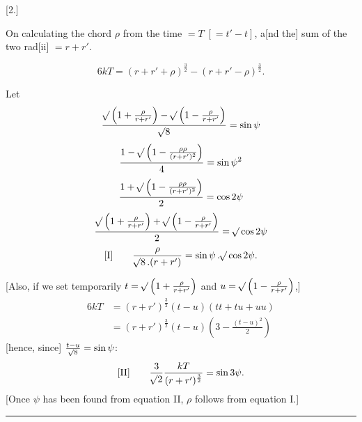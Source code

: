 \clearpage
{}
\begin{center}
[2.]\par
\medskip
On calculating the chord \(\rho\) from the time \(=T\;[=t'-t]\), a[nd the] sum of the two rad[ii] \(=r+r'\).
\end{center}
\[
6kT=(r+r'+\rho)^{\frac{3}{2}}-(r+r'-\rho)^{\frac{3}{2}}.
\]

Let
\[
\frac{\mathord{{}^{}\!\surd}\left(1+\frac{\rho}{r+r'}\right)-\mathord{{}^{}\!\surd}\left(1-\frac{\rho}{r+r'}\right)}{\mathord{{}^{}\!\surd}8}=\sin\psi
\]
\[
\frac{1-\mathord{{}^{}\!\surd}\left(1-\frac{\rho\rho}{(r+r')^2}\right)}{4}=\sin\psi^2
\]
\[
\frac{1+\mathord{{}^{}\!\surd}\left(1-\frac{\rho\rho}{(r+r')^2}\right)}{2}=\cos2\psi
\]
\[
\frac{\mathord{{}^{}\!\surd}\left(1+\frac{\rho}{r+r'}\right)+\mathord{{}^{}\!\surd}\left(1-\frac{\rho}{r+r'}\right)}{2}=\mathord{{}^{}\!\surd}\cos2\psi
\]
\[
\mathrm{[I]}\qquad \frac{\rho}{\mathord{{}^{}\!\surd}8\,.(r+r')}=\sin\psi\,.\mathord{{}^{}\!\surd}\cos2\psi.
\]

[Also, if we set temporarily \(t=\mathord{{}^{}\!\surd}\left(1+\frac{\rho}{r+r'}\right)\) and \(u=\mathord{{}^{}\!\surd}\left(1-\frac{\rho}{r+r'}\right)\),]
\[
\begin{aligned}
6kT&=(r+r')^{\frac{3}{2}}(t-u)(tt+tu+uu)\\
&=(r+r')^{\frac{3}{2}}(t-u)\left(3-\frac{(t-u)^2}{2}\right)
\end{aligned}
\]
[hence, since] \(\frac{t-u}{\mathord{{}^{}\!\surd}8}=\sin\psi\):
\[
\mathrm{[II]}\qquad \frac{3}{\mathord{{}^{}\!\surd}2}\frac{kT}{(r+r')^{\frac{3}{2}}}=\sin3\psi.
\]
[Once \(\psi\) has been found from equation II, \(\rho\) follows from equation I.]
\begin{center}\rule{.3\linewidth}{.4pt}\end{center}
